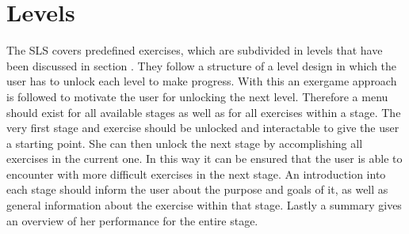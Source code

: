 \section{Levels}\label{4_3_stages}
The SLS covers predefined exercises, which are subdivided in levels that have been discussed in section \textit{}. They follow a structure of a level design in which the user has to unlock each level to make progress. With this an exergame approach is followed to motivate the user for unlocking the next level. Therefore a menu should exist for all available stages as well as for all exercises within a stage. The very first stage and exercise should be unlocked and interactable to give the user a starting point. She can then unlock the next stage by accomplishing all exercises in the current one. In this way it can be ensured that the user is able to encounter with more difficult exercises in the next stage. An introduction into each stage should inform the user about the purpose and goals of it, as well as general information about the exercise within that stage. Lastly a summary gives an overview of her performance for the entire stage.

